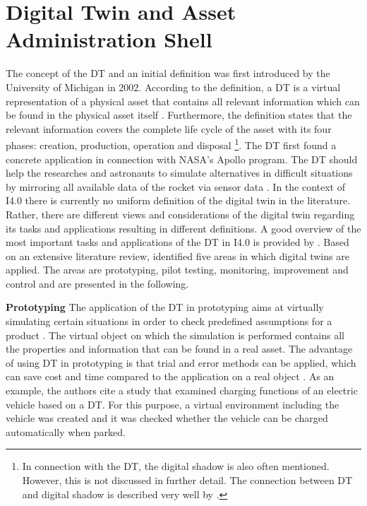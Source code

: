 \section{Digital Twin and Asset Administration Shell}

The concept of the \ac{DT} and an initial definition was first introduced by the University of Michigan in 2002. According to the definition, a \ac{DT} is a virtual representation of a physical asset that contains all relevant information which can be found in the physical asset itself \cite[p. 92]{Grieves2017DigitalSystems}. Furthermore, the definition states that the relevant information covers the complete life cycle of the asset with its four phases: creation, production, operation and disposal \footnote{In connection with the \ac{DT}, the digital shadow is also often mentioned. However, this is not discussed in further detail. The connection between \ac{DT} and digital shadow is described very well by \citet[p. 5]{Malakuti2021AnTwins}.}. The \ac{DT} first found a concrete application in connection with NASA's Apollo program. The \ac{DT} should help the researches and astronauts to simulate alternatives in difficult situations by mirroring all available data of the rocket via sensor data \cite[p. 94]{Grieves2017DigitalSystems}. In the context of \ac{I4.0} there is currently no uniform definition of the digital twin in the literature. Rather, there are different views and considerations of the digital twin regarding its tasks and applications resulting in different definitions. A good overview of the most important tasks and applications of the \ac{DT} in \ac{I4.0} is provided by \citet{Son2021PastManufacturing}. Based on an extensive literature review, \citet{Son2021PastManufacturing} identified five areas in which digital twins are applied. The areas are prototyping, pilot testing, monitoring, improvement and control and are presented in the following. 

\textbf{Prototyping} The application of the \ac{DT} in prototyping aims at virtually simulating certain situations in order to check predefined assumptions for a product \cite[p. 7]{Son2021PastManufacturing}. The virtual object on which the simulation is performed contains all the properties and information that can be found in a real asset. The advantage of using \ac{DT} in prototyping is that trial and error methods can be applied, which can save cost and time compared to the application on a real object \cite[p. 2]{Son2021PastManufacturing}. As an example, the authors cite a study that examined charging functions of an electric vehicle based on a \ac{DT}. For this purpose, a virtual environment including the vehicle was created and it was checked whether the vehicle can be charged automatically when parked.

